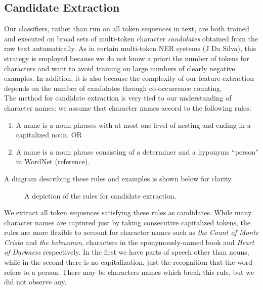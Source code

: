 \documentclass[12pt]{article}
\begin{document}
    \subsection{Candidate Extraction}
        Our classifiers, rather than run on all token sequences in text, are both trained and executed on
        broad sets of multi-token character \emph{candidates} obtained from the raw text automatically. 
        As in certain multi-token NER systems (J Da Silva), this strategy is employed because we do not
        know a priori the number of tokens for characters and want to avoid training on large numbers
        of clearly negative examples. In addition, it is also because the complexity of our feature extraction 
        depends on the number of candidates through co-occurrence counting. \\

        The method for candidate extraction is very tied to our understanding of character names: we assume
        that character names accord to the following rules:
        \begin{enumerate}
            \item A name is a noun phrases with at most one level of nesting and ending in a capitalized noun. OR
            \item A name is a noun phrase consisting of a determiner and a hyponyms ``person" in WordNet (reference). 
        \end{enumerate}
        A diagram describing these rules and examples is shown below for clarity.

        \begin{figure}[H]
            \centering
            \caption{A depiction of the rules for candidate extraction.}
        \end{figure}

        We extract all token sequences satisfying these rules as candidates.
        While many character names are captured just by taking consecutive capitalized tokens, the rules
        are more flexible to account for character names such as \emph{the Count of Monte Cristo} and 
        \emph{the helmsman}, characters in the eponymously-named book and \emph{Heart of Darkness} respectively.
        In the first we have parts of speech other than nouns, while in the second there is no capitalization,
        just the recognition that the word refers to a person. There may be characters names which break
        this rule, but we did not observe any.\\
\end{document}
